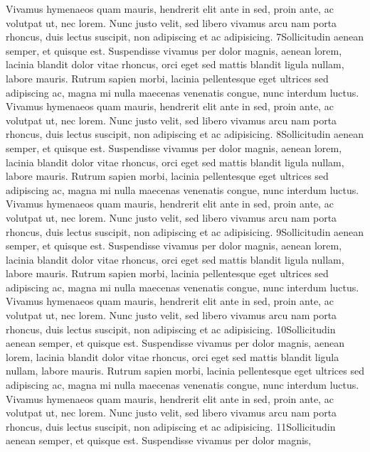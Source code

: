 Vivamus hymenaeos quam mauris, hendrerit elit ante in sed, proin ante, ac volutpat
ut, nec lorem. Nunc justo velit, sed libero vivamus arcu nam porta rhoncus, duis
lectus suscipit, non adipiscing et ac adipisicing.
7Sollicitudin aenean semper, et quisque est. Suspendisse vivamus per dolor magnis,
aenean lorem, lacinia blandit dolor vitae rhoncus, orci eget sed mattis blandit
ligula nullam, labore mauris. Rutrum sapien morbi, lacinia pellentesque eget ultrices
sed adipiscing ac, magna mi nulla maecenas venenatis congue, nunc interdum luctus.
Vivamus hymenaeos quam mauris, hendrerit elit ante in sed, proin ante, ac volutpat
ut, nec lorem. Nunc justo velit, sed libero vivamus arcu nam porta rhoncus, duis
lectus suscipit, non adipiscing et ac adipisicing.
8Sollicitudin aenean semper, et quisque est. Suspendisse vivamus per dolor magnis,
aenean lorem, lacinia blandit dolor vitae rhoncus, orci eget sed mattis blandit
ligula nullam, labore mauris. Rutrum sapien morbi, lacinia pellentesque eget ultrices
sed adipiscing ac, magna mi nulla maecenas venenatis congue, nunc interdum luctus.
Vivamus hymenaeos quam mauris, hendrerit elit ante in sed, proin ante, ac volutpat
ut, nec lorem. Nunc justo velit, sed libero vivamus arcu nam porta rhoncus, duis
lectus suscipit, non adipiscing et ac adipisicing.
9Sollicitudin aenean semper, et quisque est. Suspendisse vivamus per dolor magnis,
aenean lorem, lacinia blandit dolor vitae rhoncus, orci eget sed mattis blandit
ligula nullam, labore mauris. Rutrum sapien morbi, lacinia pellentesque eget ultrices
sed adipiscing ac, magna mi nulla maecenas venenatis congue, nunc interdum luctus.
Vivamus hymenaeos quam mauris, hendrerit elit ante in sed, proin ante, ac volutpat
ut, nec lorem. Nunc justo velit, sed libero vivamus arcu nam porta rhoncus, duis
lectus suscipit, non adipiscing et ac adipisicing.
10Sollicitudin aenean semper, et quisque est. Suspendisse vivamus per dolor magnis,
aenean lorem, lacinia blandit dolor vitae rhoncus, orci eget sed mattis blandit
ligula nullam, labore mauris. Rutrum sapien morbi, lacinia pellentesque eget ultrices
sed adipiscing ac, magna mi nulla maecenas venenatis congue, nunc interdum luctus.
Vivamus hymenaeos quam mauris, hendrerit elit ante in sed, proin ante, ac volutpat
ut, nec lorem. Nunc justo velit, sed libero vivamus arcu nam porta rhoncus, duis
lectus suscipit, non adipiscing et ac adipisicing.
11Sollicitudin aenean semper, et quisque est. Suspendisse vivamus per dolor magnis,
